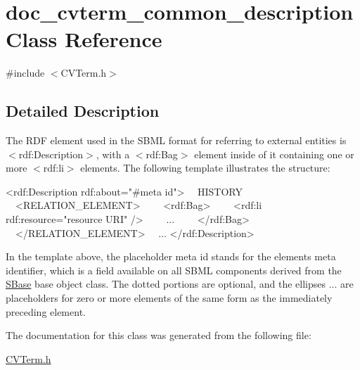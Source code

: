 \hypertarget{classdoc__cvterm__common__description}{}\section{doc\+\_\+cvterm\+\_\+common\+\_\+description Class Reference}
\label{classdoc__cvterm__common__description}


{\ttfamily \#include $<$C\+V\+Term.\+h$>$}



\subsection{Detailed Description}
\begin{DoxyParagraph}{}
The R\+DF element used in the S\+B\+ML format for referring to external entities is {\ttfamily $<$rdf\+:Description$>$}, with a {\ttfamily $<$rdf\+:Bag$>$} element inside of it containing one or more {\ttfamily $<$rdf\+:li$>$} elements. The following template illustrates the structure\+: 
\begin{DoxyPre}
<rdf:Description rdf:about="\#meta id">
~~HISTORY
~~<RELATION\_ELEMENT>
~~~~<rdf:Bag>
~~~~<rdf:li rdf:resource="resource URI" />
~~~~...
~~~~</rdf:Bag>
~~</RELATION\_ELEMENT>
~~...
</rdf:Description>
\end{DoxyPre}
 In the template above, the placeholder meta id stands for the element\textquotesingle{}s meta identifier, which is a field available on all S\+B\+ML components derived from the \hyperlink{class_s_base}{S\+Base} base object class. The dotted portions are optional, and the ellipses ... are placeholders for zero or more elements of the same form as the immediately preceding element. 
\end{DoxyParagraph}


The documentation for this class was generated from the following file\+:\begin{DoxyCompactItemize}
\item 
\hyperlink{_c_v_term_8h}{C\+V\+Term.\+h}\end{DoxyCompactItemize}
